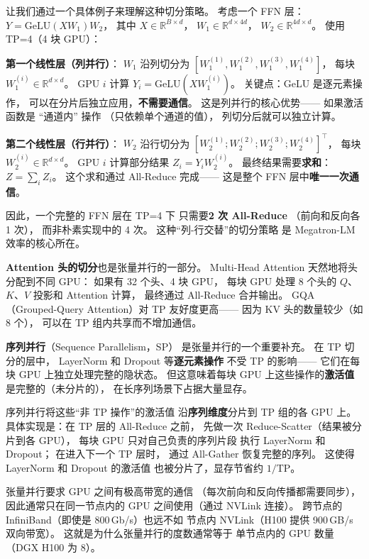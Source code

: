 让我们通过一个具体例子来理解这种切分策略。
考虑一个 FFN 层：$Y = \mathrm{GeLU}(XW_1) W_2$，
其中 $X \in \mathbb{R}^{B \times d}$，
$W_1 \in \mathbb{R}^{d \times 4d}$，
$W_2 \in \mathbb{R}^{4d \times d}$。
使用 TP=4（4 块 GPU）：

\textbf{第一个线性层（列并行）}：
$W_1$ 沿列切分为 $[W_1^{(1)}, W_1^{(2)}, W_1^{(3)}, W_1^{(4)}]$，
每块 $W_1^{(i)} \in \mathbb{R}^{d \times d}$。
GPU $i$ 计算 $Y_i = \mathrm{GeLU}(X W_1^{(i)})$。
关键点：GeLU 是逐元素操作，
可以在分片后独立应用，\textbf{不需要通信}。
这是列并行的核心优势——
如果激活函数是 ``通道内'' 操作
（只依赖单个通道的值），
列切分后就可以独立计算。

\textbf{第二个线性层（行并行）}：
$W_2$ 沿行切分为 $[W_2^{(1)}; W_2^{(2)}; W_2^{(3)}; W_2^{(4)}]^\top$，
每块 $W_2^{(i)} \in \mathbb{R}^{d \times d}$。
GPU $i$ 计算部分结果 $Z_i = Y_i W_2^{(i)}$。
最终结果需要\textbf{求和}：$Z = \sum_i Z_i$。
这个求和通过 All-Reduce 完成——
这是整个 FFN 层中\textbf{唯一一次通信}。

因此，一个完整的 FFN 层在 TP=4 下
只需要\textbf{2 次 All-Reduce}
（前向和反向各 1 次），
而非朴素实现中的 4 次。
这种``列-行交替''的切分策略
是 Megatron-LM 效率的核心所在。

\textbf{Attention 头的切分}也是张量并行的一部分。
Multi-Head Attention 天然地将头分配到不同 GPU：
如果有 32 个头、4 块 GPU，
每块 GPU 处理 8 个头的 $Q$、$K$、$V$ 投影和 Attention 计算，
最终通过 All-Reduce 合并输出。
GQA（Grouped-Query Attention）对 TP 友好度更高——
因为 KV 头的数量较少（如 8 个），
可以在 TP 组内共享而不增加通信。

\textbf{序列并行}（Sequence Parallelism，SP）
是张量并行的一个重要补充。
在 TP 切分的层中，
LayerNorm 和 Dropout 等\textbf{逐元素操作}
不受 TP 的影响——
它们在每块 GPU 上独立处理完整的隐状态。
但这意味着每块 GPU 上这些操作的\textbf{激活值}
是完整的（未分片的），
在长序列场景下占据大量显存。

序列并行将这些``非 TP 操作''的激活值
沿\textbf{序列维度}分片到 TP 组的各 GPU 上。
具体实现是：在 TP 层的 All-Reduce 之前，
先做一次 Reduce-Scatter（结果被分片到各 GPU），
每块 GPU 只对自己负责的序列片段
执行 LayerNorm 和 Dropout；
在进入下一个 TP 层时，
通过 All-Gather 恢复完整的序列。
这使得 LayerNorm 和 Dropout 的激活值
也被分片了，显存节省约 $1/\mathrm{TP}$。

张量并行要求 GPU 之间有极高带宽的通信
（每次前向和反向传播都需要同步），
因此通常只在同一节点内的 GPU 之间使用（通过 NVLink 连接）。
跨节点的 InfiniBand（即使是 800\,Gb/s）也远不如
节点内 NVLink（H100 提供 900\,GB/s 双向带宽）。
这就是为什么张量并行的度数通常等于
单节点内的 GPU 数量（DGX H100 为 8）。

